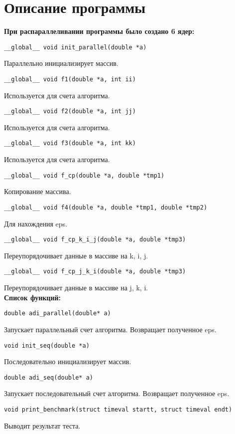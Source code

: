\documentclass[a4paper,12pt,titlepage,draft]{article}
\begin{document}
\section{Описание программы}
\textbf{При распараллеливании программы было создано 6 ядер:}\\
\begin{verbatim}
__global__ void init_parallel(double *a)
\end{verbatim}
Параллельно инициализирует массив.\\
\begin{verbatim}
__global__ void f1(double *a, int ii)
\end{verbatim}
Используется для счета алгоритма.
\begin{verbatim}
__global__ void f2(double *a, int jj)
\end{verbatim}
Используется для счета алгоритма.
\begin{verbatim}
__global__ void f3(double *a, int kk)
\end{verbatim}
Используется для счета алгоритма.\\
\begin{verbatim}
__global__ void f_cp(double *a, double *tmp1)
\end{verbatim}
Копирование массива.\\
\begin{verbatim}
__global__ void f4(double *a, double *tmp1, double *tmp2)
\end{verbatim}
Для нахождения eps.\\
\begin{verbatim}
__global__ void f_cp_k_i_j(double *a, double *tmp3)
\end{verbatim}
Переупорядочивает данные в массиве на k, i, j.\\
\begin{verbatim}
__global__ void f_cp_j_k_i(double *a, double *tmp3)
\end{verbatim}
Переупорядочивает данные в массиве на j, k, i.\\

\textbf{Список функций:}\\
\begin{verbatim}
double adi_parallel(double* a)
\end{verbatim}
Запускает параллельный счет алгоритма. Возвращает полученное eps.
\begin{verbatim}
void init_seq(double *a)
\end{verbatim}
Последовательно инициализирует массив.
\begin{verbatim}
double adi_seq(double* a)
\end{verbatim}
Запускает последовательный счет алгоритма. Возвращает полученное eps.
\begin{verbatim}
void print_benchmark(struct timeval startt, struct timeval endt)
\end{verbatim}
Выводит результат теста.
\newpage
\end{document}
